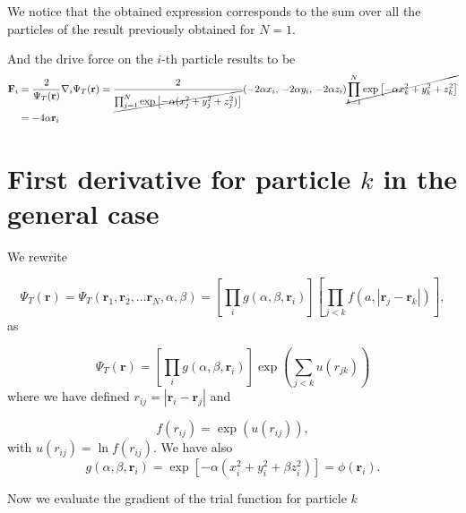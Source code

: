 \documentclass{article}
\begin{document}
We notice that the obtained expression corresponds to the sum over all the particles of the result previously obtained for $N=1$.


And the drive force on the $i$-th particle results to be
\begin{align*}
    \mathbf{F}_i &= \frac{2}{\Psi_T(\mathbf{r})} \nabla_i \Psi_T(\mathbf{r}) = \frac{2}{\cancel{\prod_{j=1}^N \text{exp}\left[-\alpha (x_j^2 + y_j^2 + z_j^2)\right]}} (-2\alpha x_i,\, -2\alpha y_i,\, -2\alpha z_i) \cancel{\prod_{k=1}^N \text{exp}\left[-\alpha x_k^2 + y_k^2 + z_k^2 \right]} \\
    &= -4\alpha \mathbf{r}_i
\end{align*}




\section{First derivative for particle $k$ in the general case}
We rewrite 

\begin{equation*}
    \Psi_T(\mathbf{r})=\Psi_T(\mathbf{r}_1, \mathbf{r}_2, \dots \mathbf{r}_N,\alpha,\beta)
    = \left[ \prod_i g(\alpha,\beta,\mathbf{r}_i) \right]
    \left[ \prod_{j<k}f(a,|\mathbf{r}_j-\mathbf{r}_k|) \right],
\end{equation*}
as

\begin{equation*}
    \Psi_T(\mathbf{r})=\left[ \prod_i g(\alpha,\beta,\mathbf{r}_i) \right] \exp{\left(\sum_{j<k}u(r_{jk})\right)}
\end{equation*}
where we have defined $r_{ij}=|\mathbf{r}_i-\mathbf{r}_j|$
and

\begin{equation*}
   f(r_{ij})= \exp{\left(u(r_{ij})\right)},
\end{equation*}
with $u(r_{ij})=\ln{f(r_{ij})}$. We have also
\begin{equation*}
    g(\alpha,\beta,\mathbf{r}_i) = \exp{\left[-\alpha(x_i^2+y_i^2+\beta
    z_i^2)\right]}= \phi(\mathbf{r}_i).
\end{equation*}

Now we evaluate the gradient of the trial function for particle $k$
\end{document}
